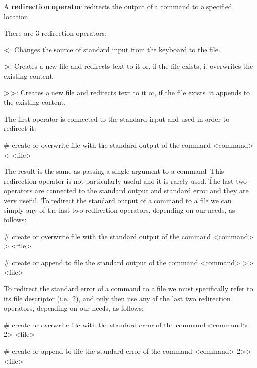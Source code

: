 A \textbf{redirection operator} redirects the output of a command to a specified location.
\ed

There are 3 redirection operators:
\bit
\item \textbf{<}: Changes the source of standard input from the keyboard to the file.
\item \textbf{>}: Creates a new file and redirects text to it or, if the file exists, it overwrites the existing content.
\item \textbf{>>}: Creates a new file and redirects text to it or, if the file exists, it appends to the existing content.
\eit

The first operator is connected to the standard input and used in order to redirect it:
\begin{bash}
# create or overwrite file with the standard output of the command
<command> < <file>
\end{bash}

The result is the same as passing a single argument to a command. This redirection operator is not particularly useful
and it is rarely used. \v

The last two operators are connected to the standard output and standard error and they are very useful. \v

To redirect the standard output of a command to a file we can simply any of the last two redirection operators,
depending on our needs, as follows:
\begin{bash}
# create or overwrite file with the standard output of the command
<command> > <file>
\end{bash}

\begin{bash}
# create or append to file the standard output of the command
<command> >> <file>
\end{bash}

To redirect the standard error of a command to a file we must specifically refer to its file descriptor (i.e.\ 2),
and only then use any of the last two redirection operators, depending on our needs, as follows:
\begin{bash}
# create or overwrite file with the standard error of the command
<command> 2> <file>
\end{bash}

\begin{bash}
# create or append to file the standard error of the command
<command> 2>> <file>
\end{bash}

